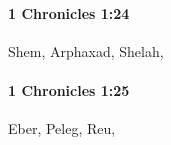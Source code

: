 		\paragraph{1 Chronicles 1:24} %
			\label{1CHRONICLES-1-24}

			Shem, Arphaxad, Shelah,


		\paragraph{1 Chronicles 1:25} %
			\label{1CHRONICLES-1-25}

			Eber, Peleg, Reu,


